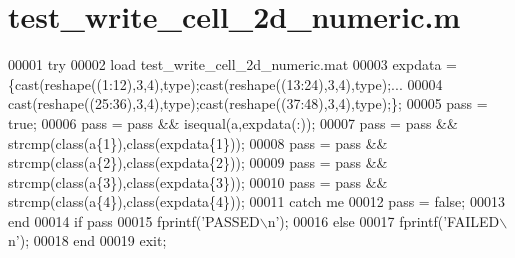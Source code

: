 \hypertarget{test__write__cell__2d__numeric_8m_source}{}\section{test\+\_\+write\+\_\+cell\+\_\+2d\+\_\+numeric.\+m}
\label{test__write__cell__2d__numeric_8m_source}

\begin{DoxyCode}
00001 \textcolor{keywordflow}{try}
00002     load test\_write\_cell\_2d\_numeric.mat
00003     expdata = \{cast(reshape((1:12),3,4),type);cast(reshape((13:24),3,4),type);...
00004                cast(reshape((25:36),3,4),type);cast(reshape((37:48),3,4),type);\};
00005     pass = \textcolor{keyword}{true};
00006     pass = pass && isequal(a,expdata(:));
00007     pass = pass && strcmp(\textcolor{keyword}{class}(a\{1\}),\textcolor{keyword}{class}(expdata\{1\}));
00008     pass = pass && strcmp(\textcolor{keyword}{class}(a\{2\}),\textcolor{keyword}{class}(expdata\{2\}));
00009     pass = pass && strcmp(\textcolor{keyword}{class}(a\{3\}),\textcolor{keyword}{class}(expdata\{3\}));
00010     pass = pass && strcmp(\textcolor{keyword}{class}(a\{4\}),\textcolor{keyword}{class}(expdata\{4\}));
00011 \textcolor{keywordflow}{catch} me
00012     pass = \textcolor{keyword}{false};
00013 end
00014 \textcolor{keywordflow}{if} pass
00015     fprintf(\textcolor{stringliteral}{'PASSED\(\backslash\)n'});
00016 \textcolor{keywordflow}{else}
00017     fprintf(\textcolor{stringliteral}{'FAILED\(\backslash\)n'});
00018 end
00019 exit;
\end{DoxyCode}

